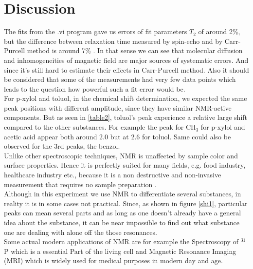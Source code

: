 \section{Discussion}
The fits from the .vi program gave us errors of  fit parameters $T_2$  of around 2\%, but the difference between relaxation time measured by spin-echo and by Carr-Purcell method is around 7\% . In that sense we can see that molecular diffusion and inhomogeneities of magnetic field are major sources of systematic errors. And since it's still hard to estimate their effects in Carr-Purcell method. Also it should be considered that some of the measurements had very few data points which leads to the question how powerful such a fit error would be.
\vspace{3mm}\\
For p-xylol and toluol, in the chemical shift determination, we expected the same peak positions with different amplitude, since they have similar NMR-active components. But as seen in \ref{table2}, toluol's peak  experience a relative large shift compared to the other substances. For example the peak for CH$_3$ for p-xylol and acetic acid appear both around 2.0 but at 2.6 for toluol. Same could also be observed for  the 3rd peaks, the benzol.
\vspace{5mm}\\
Unlike other spectroscopic techniques, NMR is unaffected by sample color and surface properties. Hence it is perfectly suited for many fields, e.g. food industry, healthcare industry etc., because it is a non destructive and non-invasive measurement that requires no sample preparation \cite{bruker}.\\
Although in this experiment we use NMR to differentiate several substances, in reality it is in some cases not practical. Since, as shown in figure \ref{shi1}, particular peaks can mean several parts and as long as one doesn't already have a general idea about the substance, it can be near impossible to find out what substance one are dealing with alone off the those resonances. 
\vspace{3mm}\\
Some actual modern applications of NMR are for example the Spectroscopy of $^{31}$P which is a essential Part of the living cell and Magnetic Resonance Imaging (MRI) which is widely used for medical purposes in modern day and age.\\